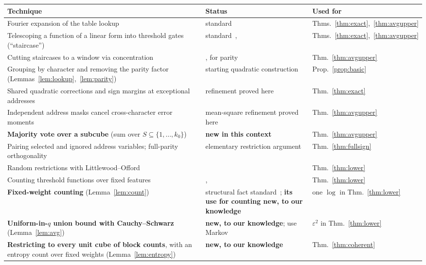 \documentclass[11pt,letterpaper]{article}
\theoremstyle{remark}
\begin{document}
\begin{center}
\small
\renewcommand{\arraystretch}{1.25}
\begin{tabular}{@{}P{0.39\textwidth}P{0.33\textwidth}P{0.2\textwidth}@{}}
\toprule
Technique & Status & Used for\\
\midrule
Fourier expansion of the table lookup & standard & Thms.~\ref{thm:exact},~\ref{thm:avgupper}\\
Telescoping a function of a linear form into threshold gates (``staircase'') & standard~\cite[Prop.~1]{HMPST}, \cite{HP} & Thms.~\ref{thm:exact},~\ref{thm:avgupper}\\
Cutting staircases to a window via concentration & \cite[Thm.~1.4]{KW}, for parity & Thm.~\ref{thm:avgupper}\\
Grouping by character and removing the parity factor (Lemmas~\ref{lem:lookup},~\ref{lem:parity}) & starting quadratic construction & Prop.~\ref{prop:basic}\\
Shared quadratic corrections and sign margins at exceptional addresses & refinement proved here & Thm.~\ref{thm:exact}\\
Independent address masks cancel cross-character error moments & mean-square refinement proved here & Thm.~\ref{thm:avgupper}\\
\textbf{Majority vote over a subcube} (sum over $S\subseteq\{1,\dots,k_0\}$) & \textbf{new in this context} & Thm.~\ref{thm:avgupper}\\
Pairing selected and ignored address variables; full-parity orthogonality & elementary restriction argument & Thm.~\ref{thm:fullsign}\\
Random restrictions with Littlewood--Offord & \cite[Lemmas~1.1, 3.1]{KW} & Thm.~\ref{thm:lower}\\
Counting threshold functions over fixed features & \cite{RSO}, \cite[Thm.~2.3]{KW} & Thm.~\ref{thm:lower}\\
\textbf{Fixed-weight counting} (Lemma~\ref{lem:count}) & structural fact standard~\cite{KW,CSS}; \textbf{its use for counting new, to our knowledge} & one $\log$ in Thm.~\ref{thm:lower}\\
\textbf{Uniform-in-$q$ union bound with Cauchy--Schwarz} (Lemma~\ref{lem:avg}) & \textbf{new, to our knowledge}; \cite{KW,KKL,CSS} use Markov & $\varepsilon^2$ in Thm.~\ref{thm:lower}\\
\textbf{Restricting to every unit cube of block counts}, with an entropy count over fixed weights (Lemma~\ref{lem:entropy}) & \textbf{new, to our knowledge} & Thm.~\ref{thm:coherent}\\

\end{tabular}
\end{center}
\end{document}
